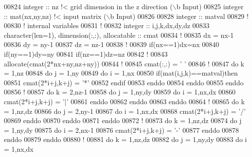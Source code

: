 \begin{DoxyCode}
00824 \textcolor{keywordtype}{integer} :: nz \textcolor{comment}{!< grid dimension in the z direction (\(\backslash\)b Input)}
00825 \textcolor{keywordtype}{integer} :: mat(nx,ny,nz) \textcolor{comment}{!< input matrix (\(\backslash\)b Input)}
00826 
00828 \textcolor{keywordtype}{integer} :: matval 
00829 \textcolor{comment}{!}
00830 \textcolor{comment}{! internal variables}
00831 \textcolor{comment}{!}
00832 \textcolor{keywordtype}{integer} :: i,j,k,dx,dy,dz
00833 \textcolor{keywordtype}{character(len=1)}, \textcolor{keywordtype}{dimension(:,:)}, \textcolor{keywordtype}{allocatable} :: cmat
00834 \textcolor{comment}{!}
00835 dx = nx-1
00836 dy = ny-1
00837 dz = nz-1
00838 \textcolor{comment}{!}
00839 \textcolor{keyword}{if}(nx==1)dx=nx
00840 \textcolor{keyword}{if}(ny==1)dy=ny
00841 \textcolor{keyword}{if}(nz==1)dz=nz
00842 \textcolor{comment}{!}
00843 \textcolor{keyword}{allocate}(cmat(2*nx+ny,nz+ny))
00844 \textcolor{comment}{!}
00845 cmat(:,:) = \textcolor{stringliteral}{' '}
00846 \textcolor{comment}{!}
00847 \textcolor{keyword}{do} k = 1,nz
00848    \textcolor{keyword}{do} j = 1,ny
00849       \textcolor{keyword}{do} i = 1,nx
00850          \textcolor{keyword}{if}(mat(i,j,k)==matval)\textcolor{keyword}{then}
00851             cmat(2*i+j,k+j) = \textcolor{stringliteral}{'*'}
00852          \textcolor{keyword}{endif}
00853       \textcolor{keyword}{enddo}
00854    \textcolor{keyword}{enddo}
00855 \textcolor{keyword}{enddo}
00856 \textcolor{comment}{!}
00857 \textcolor{keyword}{do} k = 2,nz-1
00858    \textcolor{keyword}{do} j = 1,ny,dy
00859       \textcolor{keyword}{do} i = 1,nx,dx    
00860          cmat(2*i+j,k+j) = \textcolor{stringliteral}{'|'}
00861       \textcolor{keyword}{enddo}
00862    \textcolor{keyword}{enddo}
00863 \textcolor{keyword}{enddo}
00864 \textcolor{comment}{!}
00865 \textcolor{keyword}{do} k = 1,nz,dz
00866    \textcolor{keyword}{do} j = 2,ny-1
00867       \textcolor{keyword}{do} i = 1,nx,dx    
00868          cmat(2*i+j,k+j) = \textcolor{stringliteral}{'/'}
00869       \textcolor{keyword}{enddo}
00870    \textcolor{keyword}{enddo}
00871 \textcolor{keyword}{enddo}
00872 \textcolor{comment}{!}
00873 \textcolor{keyword}{do} k = 1,nz,dz
00874    \textcolor{keyword}{do} j = 1,ny,dy
00875       \textcolor{keyword}{do} i = 2,nx-1    
00876          cmat(2*i+j,k+j) = \textcolor{stringliteral}{'-'}
00877       \textcolor{keyword}{enddo}
00878    \textcolor{keyword}{enddo}
00879 \textcolor{keyword}{enddo}
00880 \textcolor{comment}{!}
00881 \textcolor{keyword}{do} k = 1,nz,dz
00882    \textcolor{keyword}{do} j = 1,ny,dy
00883       \textcolor{keyword}{do} i = 1,nx,dx    

\end{DoxyCode}
